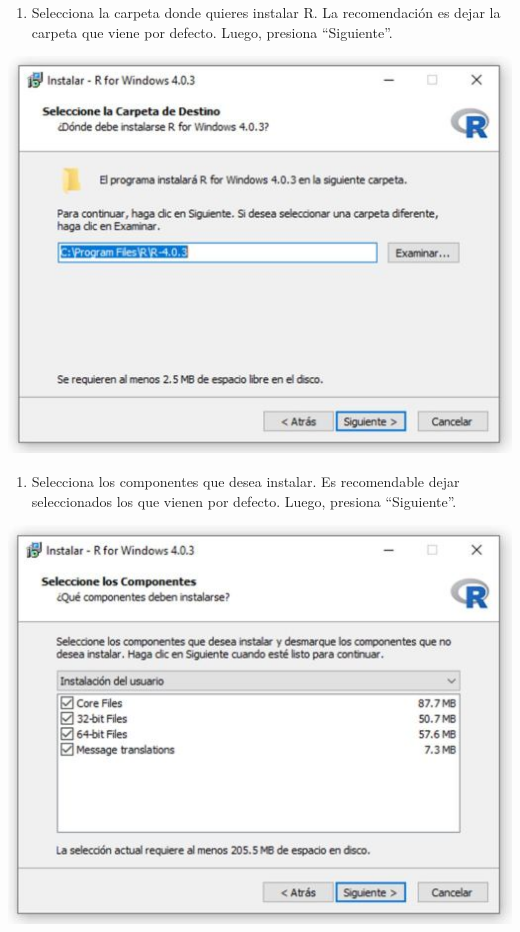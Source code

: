 \documentclass[
]{book}
\providecommand{\tightlist}{%
  \setlength{\itemsep}{0pt}\setlength{\parskip}{0pt}}
\begin{document}
\begin{enumerate}
\def\labelenumi{\arabic{enumi}.}
\setcounter{enumi}{8}
\tightlist
\item
  Selecciona la carpeta donde quieres instalar R. La recomendación es dejar la carpeta que viene por defecto. Luego, presiona ``Siguiente''.
\end{enumerate}

\includegraphics{data/09.jpg}

\begin{enumerate}
\def\labelenumi{\arabic{enumi}.}
\setcounter{enumi}{9}
\tightlist
\item
  Selecciona los componentes que desea instalar. Es recomendable dejar seleccionados los que vienen por defecto. Luego, presiona ``Siguiente''.
\end{enumerate}

\includegraphics{data/10.jpg}
\end{document}
